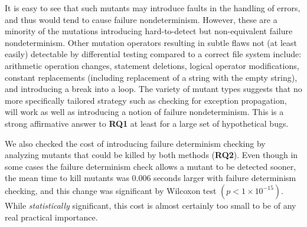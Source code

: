 \noindent It is easy to
see that such mutants may introduce faults in the handling of
errors, and thus would tend to cause failure nondeterminism.  However,
these are a minority of the mutations introducing hard-to-detect but
non-equivalent failure
nondeterminism.  Other mutation operators resulting in subtle flaws
not (at least easily) detectable by differential testing compared to a
correct file system include:  arithmetic operation changes, statement
deletions, logical operator modifications, constant replacements
(including replacement of a string with the empty string), and
introducing a break into a loop.  The variety of mutant types suggests
that no more specifically tailored strategy such as checking for
exception propagation, will work as well as introducing a notion of
failure nondeterminism.  This is a strong affirmative answer to {\bf
  RQ1} at least for a large set of hypothetical bugs.

We also checked the cost of introducing failure determinism checking
by analyzing mutants that could be killed by both methods ({\bf RQ2}).  Even
though in some cases the failure determinism check allows a mutant to
be detected sooner, the mean time to kill mutants was 0.006 seconds
larger with failure determinism checking, and this change was significant by Wilcoxon test
$(p < 1 \times 10^{-15})$.  While \emph{statistically} significant,
this cost is almost certainly
too small to be of any real practical importance.

